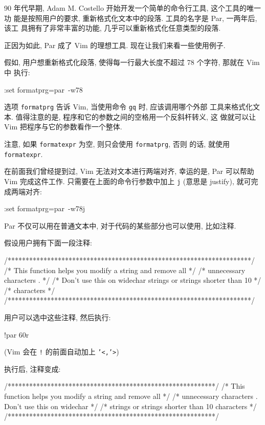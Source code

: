 90 年代早期, Adam M. Costello 开始开发一个简单的命令行工具, 这个工具的唯一功
能是按照用户的要求, 重新格式化文本中的段落. 工具的名字是 Par, 一两年后, 该工
具拥有了非常丰富的功能, 几乎可以重新格式化任意类型的段落.

正因为如此, Par 成了 Vim 的理想工具. 现在让我们来看一些使用例子.

假如, 用户想重新格式化段落, 使得每一行最大长度不超过 78 个字符, 那就在 Vim 中
执行:
\begin{vimcode}
:set formatprg=par\ -w78
\end{vimcode}

选项 \texttt{formatprg} 告诉 Vim, 当使用命令 \texttt{gq} 时, 应该调用哪个外部
工具来格式化文本. 值得注意的是, 程序和它的参数之间的空格用一个反斜杆转义, 这
做就可以让 Vim 把程序与它的参数看作一个整体.

\begin{warning}
    注意, 如果 \texttt{formatexpr} 为空, 则只会使用 \texttt{formatprg}, 否则
    的话, 就使用 \texttt{formatexpr}.
\end{warning}

在前面我们曾经提到过, Vim 无法对文本进行两端对齐, 幸运的是, Par 可以帮助 Vim
完成这件工作. 只需要在上面的命令行参数中加上 \texttt{j} (意思是 justify),
就可完成两端对齐:
\begin{vimcode}
:set formatprg=par\ -w78j
\end{vimcode}

Par 不仅可以用在普通文本中, 对于代码的某些部分也可以使用, 比如注释.

假设用户拥有下面一段注释:
\begin{vimcode}
/********************************************************************/
/* This function helps you modify a string and remove all */
/* unnecessary characters . */
/* Don't use this on widechar strings or strings shorter than 10 */
/* characters */
/********************************************************************/
\end{vimcode}
用户可以选中这些注释, 然后执行:
\begin{vimcode}
!par 60r
\end{vimcode}
(Vim 会在 \texttt{!} 的前面自动加上 \texttt{'<,'>})

执行后, 注释变成:
\begin{vimcode}
/**********************************************************/
/* This function helps you modify a string and remove all */
/* unnecessary characters . Don't use this on widechar    */
/* strings or strings shorter than 10 characters          */
/**********************************************************/
\end{vimcode}

